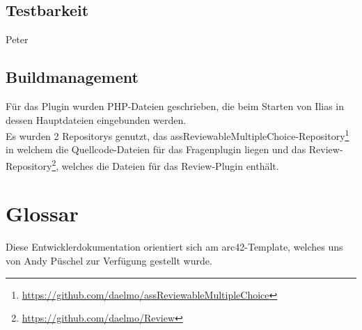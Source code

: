 \documentclass[a4paper]{scrreprt}
\begin{document}
\section{Testbarkeit}
Peter
\section{Buildmanagement}
Für das Plugin wurden PHP-Dateien geschrieben, die beim Starten von Ilias in dessen Hauptdateien eingebunden werden.\\
Es wurden 2 Repositorys genutzt, das assReviewableMultipleChoice-Repository\footnote{\url{https://github.com/daelmo/assReviewableMultipleChoice}} in welchem die Quellcode-Dateien für das Fragenplugin liegen und das Review-Repository\footnote{\url{https://github.com/daelmo/Review}}, welches die Dateien für das Review-Plugin enthält.

\chapter{Glossar}
Diese Entwicklerdokumentation orientiert sich am arc42-Template, welches uns von Andy Püschel zur Verfügung gestellt wurde.
\end{document}
